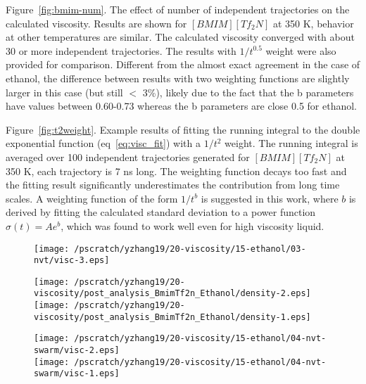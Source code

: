 \documentclass[12pt]{article}
\begin{document}
Figure~\ref{fig:bmim-num}.
The effect of number of independent trajectories on the calculated viscosity.
Results are shown for $[BMIM][Tf_2N]$ at 350 K, behavior at other temperatures are similar.
The calculated viscosity converged with about 30 or more independent trajectories.
The results with $1/t^{0.5}$ weight were also provided for comparison.
Different from the almost exact agreement in the case of ethanol,
the difference between results with two weighting functions are slightly larger in this case
(but still $<$ 3\%),
likely due to the fact that the b parameters have values between 0.60-0.73
whereas the b parameters are close 0.5 for ethanol.

Figure~\ref{fig:t2weight}.
Example results of fitting the running integral to the double exponential function (eq~\ref{eq:visc_fit}) with a $1/t^2$ weight.
The running integral is averaged over 100 independent trajectories generated for $[BMIM][Tf_2N]$ at 350 K,
each trajectory is 7 ns long.
The weighting function decays too fast and the fitting result significantly underestimates the contribution from long time scales.
A weighting function of the form $1/t^b$ is suggested in this work,
where $b$ is derived by fitting the calculated standard deviation to a power function $\sigma(t) = Ae^b$,
which was found to work well even for high viscosity liquid.



\newpage
\clearpage
\begin{figure}
\begin{center}
\texttt{[image: /pscratch/yzhang19/20-viscosity/15-ethanol/03-nvt/visc-3.eps]}
\caption{}
\label{fig:visc-longtraj}
\end{center}
\end{figure}

\newpage
\clearpage
\begin{figure}
\begin{center}
\texttt{[image: /pscratch/yzhang19/20-viscosity/post\_analysis\_BmimTf2n\_Ethanol/density-2.eps]}
\\
\texttt{[image: /pscratch/yzhang19/20-viscosity/post\_analysis\_BmimTf2n\_Ethanol/density-1.eps]}
\caption{}
\label{fig:density}
\end{center}
\end{figure}


\newpage
\clearpage
\begin{figure}
\begin{center}
\texttt{[image: /pscratch/yzhang19/20-viscosity/15-ethanol/04-nvt-swarm/visc-2.eps]}
\\
\texttt{[image: /pscratch/yzhang19/20-viscosity/15-ethanol/04-nvt-swarm/visc-1.eps]}
\caption{}
\label{fig:ethanol-ave}
\end{center}
\end{figure}
\end{document}
